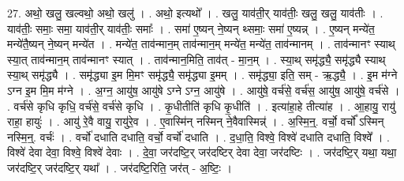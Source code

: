 \documentclass[17pt]{extarticle}
\begin{document}
27. अथो॒ खलु॒ खल्वथो॒ अथो॒ खलु॑ । . अथो॒ इत्यथो᳚ । . खलु॒ याव॑ती॒र् याव॑तीः॒ खलु॒ खलु॒ याव॑तीः । . याव॑तीः॒ समाः॒ समा॒ याव॑ती॒र् याव॑तीः॒ समाः᳚ । . समा॑ ए॒ष्यन् ने॒ष्यन् थ्समाः॒ समा॑ ए॒ष्यन्न् । . ए॒ष्यन् मन्ये॑त॒ मन्ये॑तै॒ष्यन् ने॒ष्यन् मन्ये॑त । . मन्ये॑त॒ ताव॑न्मान॒म् ताव॑न्मान॒म् मन्ये॑त॒ मन्ये॑त॒ ताव॑न्मानम् । . ताव॑न्मानꣳ स्याथ् स्या॒त् ताव॑न्मान॒म् ताव॑न्मानꣳ स्यात् । . ताव॑न्मान॒मिति॒ ताव॑त् - मा॒न॒म् । . स्या॒थ् समृ॑द्ध्यै॒ समृ॑द्ध्यै स्याथ् स्या॒थ् समृ॑द्ध्यै । . समृ॑द्ध्या इ॒म मि॒मꣳ समृ॑द्ध्यै॒ समृ॑द्ध्या इ॒मम् । . समृ॑द्ध्या॒ इति॒ सम् - ऋ॒द्ध्यै॒ । . इ॒म म॑ग्ने ऽग्न इ॒म मि॒म म॑ग्ने । . अ॒ग्न॒ आयु॑ष॒ आयु॑षे ऽग्ने ऽग्न॒ आयु॑षे । . आयु॑षे॒ वर्च॑से॒ वर्च॑स॒ आयु॑ष॒ आयु॑षे॒ वर्च॑से । . वर्च॑से कृधि कृधि॒ वर्च॑से॒ वर्च॑से कृधि । . कृ॒धीतीति॑ कृधि कृ॒धीति॑ । . इत्या॑हा॒हे तीत्या॑ह । . आ॒हायु॒ रायु॑ राहा॒ हायुः॑ । . आयु॑ रे॒वै वायु॒ रायु॑रे॒व । . ए॒वास्मि॑न् नस्मिन् ने॒वैवास्मिन्न्॑ । . अ॒स्मि॒न्॒. वर्चो॒ वर्चो᳚ ऽस्मिन् नस्मि॒न्॒. वर्चः॑ । . वर्चो॑ दधाति दधाति॒ वर्चो॒ वर्चो॑ दधाति । . द॒धा॒ति॒ विश्वे॒ विश्वे॑ दधाति दधाति॒ विश्वे᳚ । . विश्वे॑ देवा देवा॒ विश्वे॒ विश्वे॑ देवाः । . दे॒वा॒ जर॑दष्टि॒र् जर॑दष्टिर् देवा देवा॒ जर॑दष्टिः । . जर॑दष्टि॒र् यथा॒ यथा॒ जर॑दष्टि॒र् जर॑दष्टि॒र् यथा᳚ । . जर॑दष्टि॒रिति॒ जर॑त् - अ॒ष्टिः॒ । \newline
\end{document}
